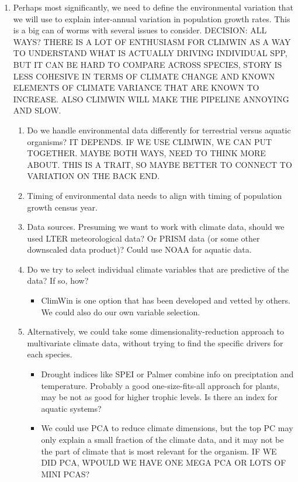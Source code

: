 \documentclass{article}
\begin{document}
\begin{enumerate}
\item{Perhaps most significantly, we need to define the environmental variation that we will use to explain inter-annual variation in population growth rates. This is a big can of worms with several issues to consider. DECISION: ALL WAYS? THERE IS A LOT OF ENTHUSIASM FOR CLIMWIN AS A WAY TO UNDERSTAND WHAT IS ACTUALLY DRIVING INDIVIDUAL SPP, BUT IT CAN BE HARD TO COMPARE ACROSS SPECIES, STORY IS LESS COHESIVE IN TERMS OF CLIMATE CHANGE AND KNOWN ELEMENTS OF CLIMATE VARIANCE THAT ARE KNOWN TO INCREASE. ALSO CLIMWIN WILL MAKE THE PIPELINE ANNOYING AND SLOW.}

\begin{enumerate}
\item{Do we handle environmental data differently for terrestrial versus aquatic organisms? IT DEPENDS. IF WE USE CLIMWIN, WE CAN PUT TOGETHER. MAYBE BOTH WAYS, NEED TO THINK MORE ABOUT. THIS IS A TRAIT, SO MAYBE BETTER TO CONNECT TO VARIATION ON THE BACK END.}

\item{Timing of environmental data needs to align with timing of population growth census year.}

\item{Data sources. Presuming we want to work with climate data, should we used LTER meteorological data? Or PRISM data (or some other downscaled data product)? Could use NOAA for aquatic data.}

\item{Do we try to select individual climate variables that are predictive of the data? If so, how?}
\begin{itemize}
\item{ClimWin is one option that has been developed and vetted by others. We could also do our own variable selection.}
\end{itemize}
\item{Alternatively, we could take some dimensionality-reduction approach to multivariate climate data, without trying to find the specific drivers for each species.}
\begin{itemize}
\item{Drought indices like SPEI or Palmer combine info on preciptation and temperature. Probably a good one-size-fits-all approach for plants, may be not as good for higher trophic levels. Is there an index for aquatic systems?}
\item{We could use PCA to reduce climate dimensions, but the top PC may only explain a small fraction of the climate data, and it may not be the part of climate that is most relevant for the organism. IF WE DID PCA, WPOULD WE HAVE ONE MEGA PCA OR LOTS OF MINI PCAS?}
\end{itemize}
\end{enumerate}
\end{enumerate}
\end{document}
